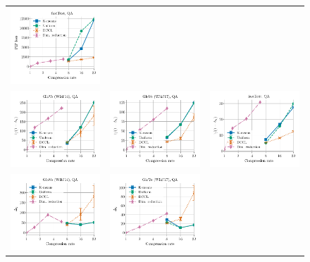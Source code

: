 \begin{figure}
\begin{tabular}{@{\hskip -0.0in}c@{\hskip -0.0in}c@{\hskip -0.0in}c@{\hskip -0.0in}}
		\includegraphics[width=.245\linewidth]{figures/fasttext1m_synthetics-large-dim_gram-large-dim-frob-error_vs_compression_linx_det.pdf}	\\
		\includegraphics[width=.245\linewidth]{figures/glove400k_synthetics-large-dim_gram-large-dim-delta1-2-trans_vs_compression_linx_det.pdf} &
		\includegraphics[width=.245\linewidth]{figures/glove-wiki400k-am_synthetics-large-dim_gram-large-dim-delta1-2-trans_vs_compression_linx_det.pdf} &
		\includegraphics[width=.245\linewidth]{figures/fasttext1m_synthetics-large-dim_gram-large-dim-delta1-2-trans_vs_compression_linx_det.pdf}	\\
		\includegraphics[width=.245\linewidth]{figures/glove400k_synthetics-large-dim_gram-large-dim-delta2-2_vs_compression_linx_det.pdf} &
		\includegraphics[width=.245\linewidth]{figures/glove-wiki400k-am_synthetics-large-dim_gram-large-dim-delta2-2_vs_compression_linx_det.pdf} &

\end{tabular}
\end{figure}
